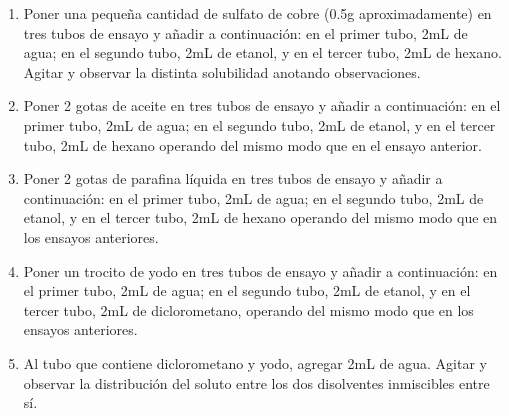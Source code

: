 \begin{enumerate}
    \item Poner una pequeña cantidad de sulfato de cobre (0.5g aproximadamente) en tres tubos de ensayo y añadir a continuación: en el primer tubo, 2mL de agua; en el segundo tubo, 2mL de etanol, y en el tercer tubo, 2mL de hexano. Agitar y observar la distinta solubilidad anotando observaciones.
    \item Poner 2 gotas de aceite en tres tubos de ensayo y añadir a continuación: en el primer tubo, 2mL de agua; en el segundo tubo, 2mL de etanol, y en el tercer tubo, 2mL de hexano operando del mismo modo que en el ensayo anterior. 
    \item Poner 2 gotas de parafina líquida en tres tubos de ensayo y añadir a continuación: en el primer tubo, 2mL de agua; en el segundo tubo, 2mL de etanol, y en el tercer tubo, 2mL de hexano operando del mismo modo que en los ensayos anteriores. 
    \item Poner un trocito de yodo en tres tubos de ensayo y añadir a continuación: en el primer tubo, 2mL de agua; en el segundo tubo, 2mL de etanol, y en el tercer tubo, 2mL de diclorometano, operando del mismo modo que en los ensayos anteriores.
    \item Al tubo que contiene diclorometano y yodo, agregar 2mL de agua. Agitar y observar la distribución del soluto entre los dos disolventes inmiscibles entre sí. 
\end{enumerate}